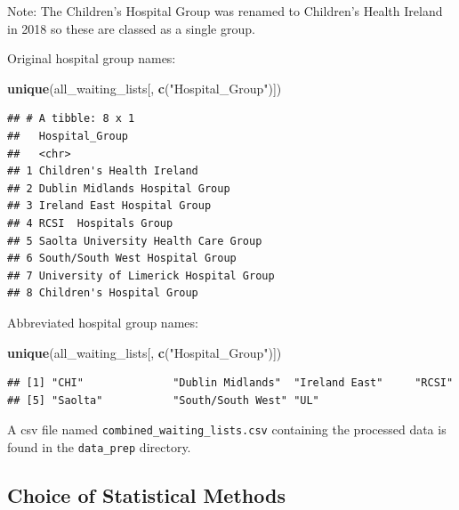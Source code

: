 \documentclass[
  12pt,
]{article}
\newenvironment{Shaded}{\begin{snugshade}}{\end{snugshade}}
\newcommand{\KeywordTok}[1]{\textcolor[rgb]{0.13,0.29,0.53}{\textbf{#1}}}
\newcommand{\NormalTok}[1]{#1}
\newcommand{\StringTok}[1]{\textcolor[rgb]{0.31,0.60,0.02}{#1}}
\begin{document}
Note: The Children's Hospital Group was renamed to Children's Health Ireland in 2018 so these are classed as a single group.

Original hospital group names:
\small

\begin{Shaded}
\begin{Highlighting}[]
\KeywordTok{unique}\NormalTok{(all\_waiting\_lists[, }\KeywordTok{c}\NormalTok{(}\StringTok{"Hospital\_Group"}\NormalTok{)])}
\end{Highlighting}
\end{Shaded}

\begin{verbatim}
## # A tibble: 8 x 1
##   Hospital_Group                       
##   <chr>                                
## 1 Children's Health Ireland            
## 2 Dublin Midlands Hospital Group       
## 3 Ireland East Hospital Group          
## 4 RCSI  Hospitals Group                
## 5 Saolta University Health Care Group  
## 6 South/South West Hospital Group      
## 7 University of Limerick Hospital Group
## 8 Children's Hospital Group
\end{verbatim}

\normalsize

Abbreviated hospital group names:
\small

\begin{Shaded}
\begin{Highlighting}[]
\KeywordTok{unique}\NormalTok{(all\_waiting\_lists[, }\KeywordTok{c}\NormalTok{(}\StringTok{"Hospital\_Group"}\NormalTok{)])}
\end{Highlighting}
\end{Shaded}

\begin{verbatim}
## [1] "CHI"              "Dublin Midlands"  "Ireland East"     "RCSI"            
## [5] "Saolta"           "South/South West" "UL"
\end{verbatim}

\normalsize

A csv file named \texttt{combined\_waiting\_lists.csv} containing the processed data is found in the \texttt{data\_prep} directory.

\newpage

\hypertarget{choice-of-statistical-methods}{%
\subsection{Choice of Statistical Methods}\label{choice-of-statistical-methods}}
\end{document}
